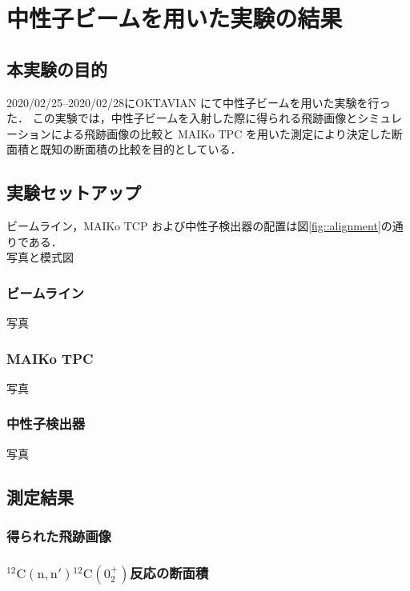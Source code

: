 \documentclass[../master]{subfiles}
\begin{document}
\chapter{中性子ビームを用いた実験の結果}
\section{本実験の目的}
2020/02/25--2020/02/28にOKTAVIAN にて中性子ビームを用いた実験を行った．
この実験では，中性子ビームを入射した際に得られる飛跡画像とシミュレーションによる飛跡画像の比較と
MAIKo TPC を用いた測定により決定した断面積と既知の断面積の比較を目的としている．

\section{実験セットアップ}
ビームライン，MAIKo TCP および中性子検出器の配置は図\ref{fig::alignment}の通りである．
\\写真と模式図

\subsection{ビームライン}
写真

\subsection{MAIKo TPC}
写真

\subsection{中性子検出器}
写真

\section{測定結果}
\subsection{得られた飛跡画像}

\subsection{${}^{12}\mathrm{C}(\mathrm{n},\mathrm{n}'){}^{12}\mathrm{C}(0_2^+)$反応の断面積}
\end{document}
